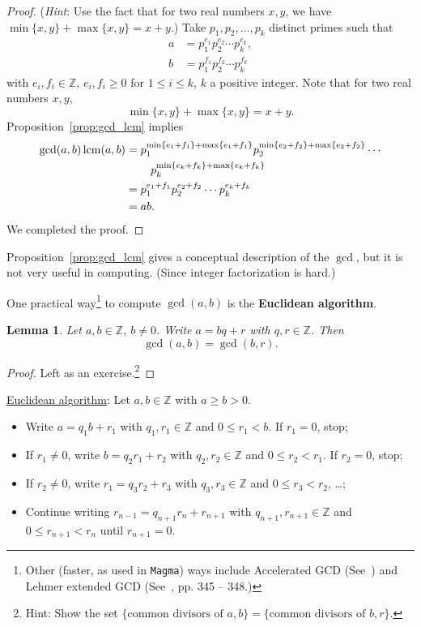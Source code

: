 \documentclass{amsbook}
\theoremstyle{plain}
\newtheorem{lemma}[theorem]{Lemma}
\theoremstyle{definition}
\theoremstyle{remark}
\numberwithin{equation}{chapter}
\numberwithin{figure}{chapter}
\begin{document}
\begin{proof}
 (\emph{Hint}: Use the fact that for two real numbers $x, y$, we have $\min \{x, y\} + \max \{x, y\} = x + y$.)
Take $p_1, p_2, \ldots, p_k$ distinct primes such that 
\begin{align}
a &=  p_1^{e_1} p_2^{e_2} \cdots p_k^{e_k}, \\
b &=  p_1^{f_1} p_2^{f_2} \cdots p_k^{f_k}
\end{align}
with $e_i, f_i \in \mathbb{Z}$, $e_i, f_i \geqslant 0$ for $1 \leqslant i \leqslant k$, $k$ a positive integer. Note that for two real numbers $x, y$, 
\[
\min \{x, y\} + \max \{x, y\} = x + y.
\]
Proposition~\ref{prop:gcd_lcm} implies 
\begin{align}
\gcd(a, b) \, {\rm lcm}(a, b) &= p_1^{ \min \{ e_1 + f_1\} + \max\{ e_1 + f_1 \} } p_2^{ \min \{ e_2 + f_2\} + \max\{ e_2 + f_2 \} } \cdots \\
& \hspace{7.8mm} p_k^{ \min \{ e_k + f_k\} + \max\{ e_k + f_k \} } \\
                              &= p_1^{e_1 + f_1} p_2^{e_2 + f_2} \cdots p_k^{e_k + f_k} \\
                              &= ab.
\end{align}
We completed the proof.
\end{proof}
Proposition~\ref{prop:gcd_lcm} gives a conceptual description of the $\gcd$, but it is not very useful in computing. (Since integer factorization is hard.) 

One practical way\footnote{Other (faster, as used in \texttt{Magma}) ways include Accelerated GCD (See~\cite{Weber1995}) and Lehmer extended GCD (See~\cite{Knuth1997}, pp. 345 -- 348.)} to compute $\gcd(a, b)$ is the \textbf{Euclidean algorithm}.

\begin{lemma}\label{lem:lem1_day6}
Let $a, b \in \mathbb{Z}$, $b \neq 0$. Write $a = bq + r$ with $q, r \in \mathbb{Z}$. Then 
\[
\gcd (a, b) = \gcd (b, r).
\]
\end{lemma}
\begin{proof}
Left as an exercise.\footnote{Hint: Show the set $\{ \text{common divisors of } a, b \} = \{ \text{common divisors of } b, r \}$.}
\end{proof}

\underline{Euclidean al}g\underline{orithm}: Let $a, b \in \mathbb{Z}$ with $a \geqslant b > 0$.
\begin{itemize}
\item Write $a = q_1 b + r_1$ with $q_1, r_1 \in \mathbb{Z}$ and $0 \leqslant r_1 < b$. If $r_1 = 0$, stop; 
\item If $r_1 \neq 0 $, write $b = q_2 r_1  + r_2$ with $q_2, r_2 \in \mathbb{Z}$ and $0 \leqslant r_2 < r_1$. If $r_2 = 0$, stop;
\item If $r_2 \neq 0 $, write $r_1 = q_3 r_2 + r_3$ with $q_3, r_3 \in \mathbb{Z}$ and $0 \leqslant r_3 < r_2$, \ldots ;
\item Continue writing $r_{n-1} = q_{n+1} r_n + r_{n+1}$ with $q_{n+1}, r_{n+1} \in \mathbb{Z}$ and $0 \leqslant r_{n+1} < r_n$ until $r_{n+1} = 0$.
\end{itemize}
\end{document}
